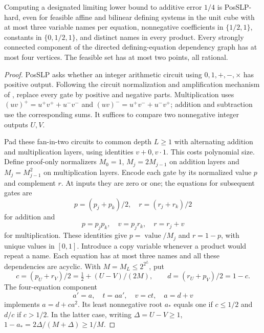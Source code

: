 \begin{proposition}\label{prop:fbbt-hardness}
Computing a designated limiting lower bound to additive error $1/4$ is
PosSLP-hard, even for feasible affine and bilinear defining systems in
the unit cube with at most three variable names per equation,
nonnegative coefficients in $\{1/2,1\}$, constants in $\{0,1/2,1\}$,
and distinct names in every product. Every strongly connected component
of the directed defining-equation dependency graph has at most four
vertices. The feasible set has at most two points, all rational.
\end{proposition}
\begin{proof}
PosSLP asks whether an integer arithmetic circuit using $0,1,+,-,\times$
has positive output. Following the circuit normalization and amplification
mechanism of \citet[Theorem 5.2]{EtessamiYannakakis2009}, replace every
gate by positive and negative parts. Multiplication uses
$(uv)^+=u^+v^++u^-v^-$ and $(uv)^-=u^+v^-+u^-v^+$; addition and
subtraction use the corresponding sums. It suffices to compare two
nonnegative integer outputs $U,V$.

Pad these fan-in-two circuits to common depth $L\ge1$ with alternating
addition and multiplication layers, using identities $v+0,v\cdot1$.
This costs polynomial size. Define proof-only normalizers $M_0=1$,
$M_j=2M_{j-1}$ on addition layers and $M_j=M_{j-1}^2$ on multiplication
layers. Encode each gate by its normalized value $p$ and complement $r$.
At inputs they are zero or one; the equations for subsequent gates are
\[
 p=(p_j+p_k)/2,\quad r=(r_j+r_k)/2
\]
for addition and
\[
 p=p_jp_k,\quad v=p_jr_k,\quad r=r_j+v
\]
for multiplication. These identities give $p=\operatorname{value}/M_j$
and $r=1-p$, with unique values in $[0,1]$. Introduce a copy variable
whenever a product would repeat a name. Each equation has at most three
names and all these dependencies are acyclic. With $M=M_L\le2^{2^L}$,
put
\[
 c=(p_U+r_V)/2=\tfrac12+(U-V)/(2M),\qquad
 d=(r_U+p_V)/2=1-c.
\]
The four-equation component
\[
 a'=a,\quad t=aa',\quad v=ct,\quad a=d+v
\]
implements $a=d+ca^2$. Its least nonnegative root $a_*$ equals one if
$c\le1/2$ and $d/c$ if $c>1/2$. In the latter case, writing
$\Delta=U-V\ge1$,
$1-a_*=2\Delta/(M+\Delta)\ge1/M$.


\end{proof}

